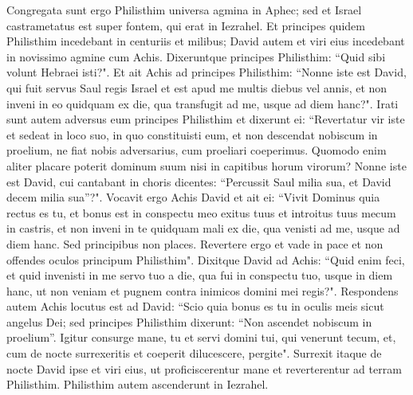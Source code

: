 \begin{biblechapter}  
\verse Congregata sunt ergo Philisthim universa agmina in Aphec; sed et Israel castrametatus est super fontem, qui erat in Iezrahel. 
\verse Et principes quidem Philisthim incedebant in centuriis et milibus; David autem et viri eius incedebant in novissimo agmine cum Achis. 
\verse Dixeruntque principes Philisthim: “Quid sibi volunt Hebraei isti?". Et ait Achis ad principes Philisthim: “Nonne iste est David, qui fuit servus Saul regis Israel et est apud me multis diebus vel annis, et non inveni in eo quidquam ex die, qua transfugit ad me, usque ad diem hanc?". 
\verse Irati sunt autem adversus eum principes Philisthim et dixerunt ei: “Revertatur vir iste et sedeat in loco suo, in quo constituisti eum, et non descendat nobiscum in proelium, ne fiat nobis adversarius, cum proeliari coeperimus. Quomodo enim aliter placare poterit dominum suum nisi in capitibus horum virorum? 
\verse Nonne iste est David, cui cantabant in choris dicentes: “Percussit Saul milia sua, et David decem milia sua”?". 
\verse Vocavit ergo Achis David et ait ei: “Vivit Dominus quia rectus es tu, et bonus est in conspectu meo exitus tuus et introitus tuus mecum in castris, et non inveni in te quidquam mali ex die, qua venisti ad me, usque ad diem hanc. Sed principibus non places. 
\verse Revertere ergo et vade in pace et non offendes oculos principum Philisthim". 
\verse Dixitque David ad Achis: “Quid enim feci, et quid invenisti in me servo tuo a die, qua fui in conspectu tuo, usque in diem hanc, ut non veniam et pugnem contra inimicos domini mei regis?". 
\verse Respondens autem Achis locutus est ad David: “Scio quia bonus es tu in oculis meis sicut angelus Dei; sed principes Philisthim dixerunt: “Non ascendet nobiscum in proelium”. 
\verse Igitur consurge mane, tu et servi domini tui, qui venerunt tecum, et, cum de nocte surrexeritis et coeperit dilucescere, pergite". 
\verse Surrexit itaque de nocte David ipse et viri eius, ut proficiscerentur mane et reverterentur ad terram Philisthim. Philisthim autem ascenderunt in Iezrahel. 
\end{biblechapter}

